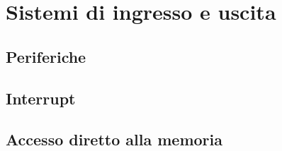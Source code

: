 \chapter{Sistemi di ingresso e uscita}
\section{Periferiche}
\section{Interrupt}
\section{Accesso diretto alla memoria}
